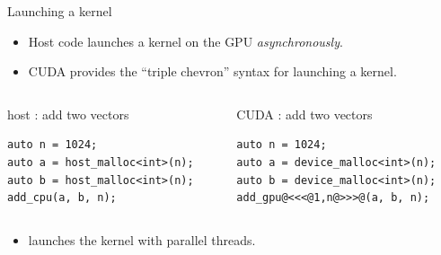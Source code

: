 \documentclass[aspectratio=43]{beamer}
\begin{document}
\begin{frame}[fragile]{Launching a kernel}
    \begin{itemize}
        \item Host code launches a kernel on the GPU \emph{asynchronously}.
        \item CUDA provides the ``triple chevron''  syntax for launching a kernel.
    \end{itemize}

    \begin{columns}[T]
        \begin{column}{0.5\textwidth}
            \begin{codecolumn}{host : add two vectors}
        \begin{lstlisting}[style=boxcuda]
auto n = 1024;
auto a = host_malloc<int>(n);
auto b = host_malloc<int>(n);
add_cpu(a, b, n);
        \end{lstlisting}
            \end{codecolumn}
        \end{column} \begin{column}{0.5\textwidth}
            \begin{codecolumn}{CUDA : add two vectors}
        \begin{lstlisting}[style=boxcuda]
auto n = 1024;
auto a = device_malloc<int>(n);
auto b = device_malloc<int>(n);
add_gpu@<<<@1,n@>>>@(a, b, n);
        \end{lstlisting}
            \end{codecolumn}
        \end{column}
    \end{columns}

    \begin{itemize}
        \item {} launches the kernel  with  parallel threads.
    \end{itemize}

\end{frame}
\end{document}
